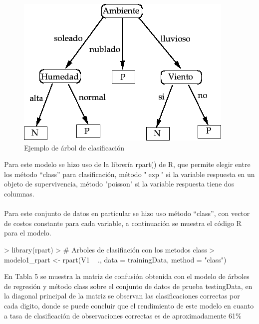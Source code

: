 \documentclass{article}
\begin{document}
\begin{figure}[H]
    \centering
	\includegraphics[scale=0.5]{figure/arboles1.png}
	\caption{Ejemplo de árbol de clasificación}
\end{figure}




Para este modelo se hizo uso de la librería rpart() de R, que permite elegir entre los método “class” para clasificación, método "$\exp$" si la variable respuesta en un objeto de supervivencia, método  "poisson"  si la variable respuesta tiene dos columnas.\\
\\
Para este conjunto de datos en particular se hizo uso método “class”, con vector de costos constante para cada variable, a continuación se muestra el código R para el modelo.  
\\
\begin{Schunk}
\begin{Sinput}
> library(rpart)
> # Arboles de clasifiación con los metodos class
> modelo1_rpart <- rpart(V1 ~ ., data = trainingData, method = "class")
\end{Sinput}
\end{Schunk}

En Tabla 5 se muestra la matriz de confusión obtenida con el modelo de árboles de regresión y método class sobre el conjunto de datos de prueba testingData, en la diagonal principal de la matriz se observan las clasificaciones correctas por cada digito, donde se puede concluir que el rendimiento de este modelo en cuanto a tasa de clasificación de observaciones correctas es de  aproximadamente 61\%
\end{document}
